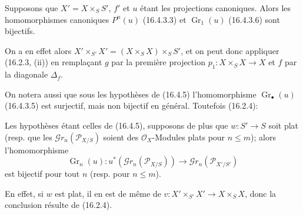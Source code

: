 \begin{proposition}[16.4.5]
\label{IV.16.4.5}
Supposons que $X'=X\times_S S'$, $f'$ et $u$ étant les projections canoniques.
Alors les homomorphismes canoniques $P^n(u)$ (16.4.3.3) et
$\operatorname{Gr}_1(u)$ (16.4.3.6) sont bijectifs.
\end{proposition}

On a en effet alors $X'\times_{S'}X'=(X\times_S X)\times_S S'$, et on peut donc
appliquer (16.2.3, (ii)) en remplaçant $g$ par la première projection
$p_1:X\times_S X\to X$ et $f$ par la diagonale $\Delta_f$.

On notera aussi que sous les hypothèses de (16.4.5) l'homomorphisme
$\operatorname{Gr}_\bullet(u)$ (16.4.3.5) est surjectif, mais non bijectif en
général. Toutefois (16.2.4):

\begin{corollary}[16.4.6]
\label{IV.16.4.6}
Les hypothèses étant celles de (16.4.5), supposons de plus que $w:S'\to S$ soit
plat (resp. que les $\mathscr{G}r_n(\mathscr{P}_{X/S})$ soient des
$\mathcal{O}_X$-Modules plats pour $n\leq m$); alors l'homomorphisme
\[
  \operatorname{Gr}_n(u):u^*(\mathscr{G}r_n(\mathscr{P}_{X/S}))
  \longrightarrow\mathscr{G}r_n(\mathscr{P}_{X'/S'})
\]
est bijectif pour tout $n$ (resp. pour $n\leq m$).
\end{corollary}

En effet, si $w$ est plat, il en est de même de
$v:X'\times_{S'}X'\to X\times_S X$, donc la conclusion résulte de (16.2.4).

